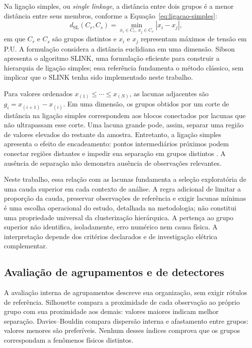 \documentclass[
	12pt,				%
	openright,			%
	oneside,			%
	a4paper,			%
	chapter=TITLE,		%
	section=TITLE,		%
	subsection=TITLE,	%
	subsubsection=TITLE,%
	english,			%
	brazilian			%
	]{abntex2}
\theoremstyle{definition}
\begin{document}
Na ligação simples, ou \textit{single linkage}, a distância entre dois
grupos é a menor distância entre seus membros, conforme a
Equação~\ref{eq:ligacao-simples}:
\begin{equation}
\label{eq:ligacao-simples}
d_{\mathrm{SL}}(C_r,C_s)
=\min_{x_i\in C_r,\,x_j\in C_s}|x_i-x_j|,
\end{equation}
em que $C_r$ e $C_s$ são grupos distintos e $x_i$ e $x_j$ representam
máximos de tensão em P.U. A formulação considera a distância euclidiana
em uma dimensão. Sibson \cite{sibson1973} apresenta o algoritmo SLINK,
uma formulação eficiente para construir a hierarquia de ligação simples;
essa referência fundamenta o método clássico, sem implicar que o SLINK
tenha sido implementado neste trabalho.

Para valores ordenados $x_{(1)}\leq\cdots\leq x_{(N)}$, as lacunas
adjacentes são $g_i=x_{(i+1)}-x_{(i)}$. Em uma dimensão, os grupos
obtidos por um corte de distância na ligação simples correspondem aos
blocos conectados por lacunas que não ultrapassam esse corte. Uma lacuna
grande pode, assim, separar uma região de valores elevados do restante
da amostra. Entretanto, a ligação simples apresenta o efeito de
encadeamento: pontos intermediários próximos podem conectar regiões
distantes e impedir sua separação em grupos distintos
\cite{jain1988}. A ausência de separação não demonstra ausência de
observações relevantes.

Neste trabalho, essa relação com as lacunas fundamenta a seleção
exploratória de uma cauda superior em cada contexto de análise. A regra
adicional de limitar a proporção da cauda, preservar observações de
referência e exigir lacunas mínimas é uma escolha operacional do estudo,
detalhada na metodologia; não constitui uma propriedade universal da
clusterização hierárquica. A pertença ao grupo superior não identifica,
isoladamente, erro numérico nem causa física. A interpretação depende
dos critérios declarados e de investigação elétrica complementar.

\subsection{Avaliação de agrupamentos e de detectores}

A avaliação interna de agrupamentos descreve sua organização, sem exigir
rótulos de referência. Silhouette compara a proximidade de cada observação
ao próprio grupo com sua proximidade aos demais: valores maiores indicam
melhor separação. Davies--Bouldin compara dispersão interna e afastamento
entre grupos: valores menores são preferíveis. Nenhum desses índices
comprova que os grupos correspondam a fenômenos físicos distintos.
\end{document}
